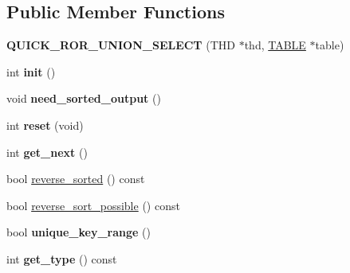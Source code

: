 \subsection*{Public Member Functions}
\begin{DoxyCompactItemize}
\item 
\mbox{\label{classQUICK__ROR__UNION__SELECT_a9a73a1da6d16df0ee7dc3727465f83dd}} 
{\bfseries Q\+U\+I\+C\+K\+\_\+\+R\+O\+R\+\_\+\+U\+N\+I\+O\+N\+\_\+\+S\+E\+L\+E\+CT} (T\+HD $\ast$thd, \mbox{\hyperlink{structTABLE}{T\+A\+B\+LE}} $\ast$table)
\item 
\mbox{\label{classQUICK__ROR__UNION__SELECT_a6c8b2f7d204e54808d00adf471d55bb7}} 
int {\bfseries init} ()
\item 
\mbox{\label{classQUICK__ROR__UNION__SELECT_a2ada312183fb233817ba66e95ebe1dcc}} 
void {\bfseries need\+\_\+sorted\+\_\+output} ()
\item 
\mbox{\label{classQUICK__ROR__UNION__SELECT_a0ca6c6816b391c8adbf0fdaedd00d8ef}} 
int {\bfseries reset} (void)
\item 
\mbox{\label{classQUICK__ROR__UNION__SELECT_acf7d4cb8c8fdebf53771ab74ba66e850}} 
int {\bfseries get\+\_\+next} ()
\item 
bool \mbox{\hyperlink{classQUICK__ROR__UNION__SELECT_a22d0dd967733702cd36538287a3d5d7f}{reverse\+\_\+sorted}} () const
\item 
bool \mbox{\hyperlink{classQUICK__ROR__UNION__SELECT_a7f3da1479da93c9dfaee4c9edb944fb7}{reverse\+\_\+sort\+\_\+possible}} () const
\item 
\mbox{\label{classQUICK__ROR__UNION__SELECT_a99fa8cbe7c144fb7bf99e3376b0a11bc}} 
bool {\bfseries unique\+\_\+key\+\_\+range} ()
\item 
\mbox{\label{classQUICK__ROR__UNION__SELECT_a7d296780310474e1f15af904a52d4ee2}} 
int {\bfseries get\+\_\+type} () const
\item 
\mbox{\label{classQUICK__ROR__UNION__SELECT_a2d00f916ce3c32dda4b4a40b61f0cf8a}} 

\end{DoxyCompactItemize}
